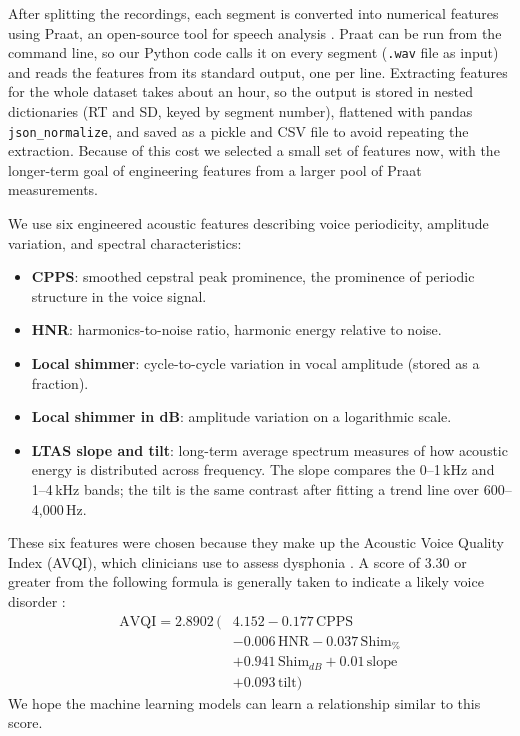 \documentclass[11pt]{article}
\begin{document}
After splitting the recordings, each segment is converted into numerical features using
Praat, an open-source tool for speech analysis \citep{Boersma2026}. Praat can be run from
the command line, so our Python code calls it on every segment (\texttt{.wav} file as input)
and reads the features from its standard output, one per line. Extracting features for the
whole dataset takes about an hour, so the output is stored in nested dictionaries (RT and
SD, keyed by segment number), flattened with pandas \texttt{json\_normalize}, and saved as a
pickle and CSV file to avoid repeating the extraction. Because of this cost we selected a
small set of features now, with the longer-term goal of engineering features from a larger
pool of Praat measurements.

We use six engineered acoustic features describing voice periodicity, amplitude variation,
and spectral characteristics:
\begin{itemize}
  \item \textbf{CPPS}: smoothed cepstral peak prominence, the prominence of periodic
    structure in the voice signal.
  \item \textbf{HNR}: harmonics-to-noise ratio, harmonic energy relative to noise.
  \item \textbf{Local shimmer}: cycle-to-cycle variation in vocal amplitude (stored as a
    fraction).
  \item \textbf{Local shimmer in dB}: amplitude variation on a logarithmic scale.
  \item \textbf{LTAS slope and tilt}: long-term average spectrum measures of how acoustic
    energy is distributed across frequency. The slope compares the 0--1\,kHz and 1--4\,kHz
    bands; the tilt is the same contrast after fitting a trend line over 600--4,000\,Hz.
\end{itemize}

These six features were chosen because they make up the Acoustic Voice Quality Index
(AVQI), which clinicians use to assess dysphonia \citep{Curtis2026}. A score of 3.30 or
greater from the following formula is generally taken to indicate a likely voice disorder
\citep{Curtis2026}:
\begin{equation}
\begin{split}
\mathrm{AVQI} = 2.8902\,\big(&4.152 - 0.177\,\mathrm{CPPS}\\
 &- 0.006\,\mathrm{HNR} - 0.037\,\mathrm{Shim}_{\%}\\
 &+ 0.941\,\mathrm{Shim}_{dB} + 0.01\,\mathrm{slope}\\
 &+ 0.093\,\mathrm{tilt}\big)
\end{split}
\end{equation}
We hope the machine learning models can learn a relationship similar to this score.
\end{document}
